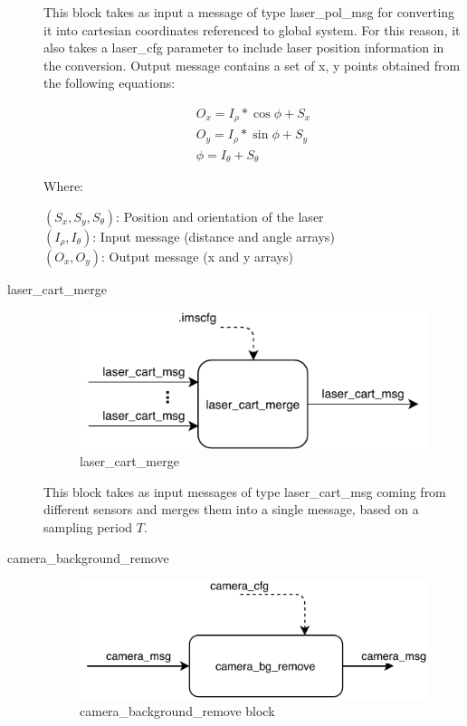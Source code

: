 \begin{description}
This block takes as input a message of type laser\_pol\_msg for converting it into cartesian coordinates referenced to global system. For this reason, it also takes a laser\_cfg parameter to include laser position information in the conversion. Output message contains a set of x, y points obtained from the following equations:

\begin{eqnarray*}
O_x = I_\rho*\cos{\phi}+S_x \\
O_y = I_\rho*\sin{\phi} + S_y \\
\phi = I_\theta + S_\theta
\end{eqnarray*}

Where:

$(S_x, S_y, S_\theta)$: Position and orientation of the laser \\
$(I_\rho, I_\theta )$: Input message (distance and angle arrays) \\
$(O_x, O_y )$: Output message (x and y arrays) \\


\item[laser\_cart\_merge] \hfill

\begin{figure}[ht!]
\centering
\includegraphics[scale=1]{fig/3/laser_cart_merge.pdf}
\caption{laser\_cart\_merge}
\label{laser_cart_merge}
\end{figure}

This block takes as input messages of type laser\_cart\_msg coming from different sensors and merges them into a single message, based on a sampling period $T$.

\item[camera\_background\_remove] \hfill

\begin{figure}[ht!]
\centering
\includegraphics[scale=1]{fig/3/camera_bg_remove.pdf}
\caption{camera\_background\_remove block}
\label{cam_bg_remove}
\end{figure}

\end{description}


